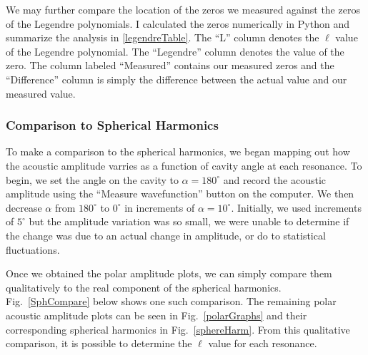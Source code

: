 \documentclass[12pt]{article}
\renewcommand{\deg}{^\circ} %
\newcommand{\figref}[1]{Fig.\ \ref{#1}}
\begin{document}
	We may further compare the location of the zeros we measured against the zeros of the Legendre polynomials. I calculated the zeros numerically in Python and summarize the analysis in \cref{legendreTable}. The ``L'' column denotes the $\ell$ value of the Legendre polynomial. The ``Legendre'' column denotes the value of the zero. The column labeled ``Measured'' contains our measured zeros and the ``Difference'' column is simply the difference between the actual value and our measured value.


	\subsubsection{Comparison to Spherical Harmonics}
	To make a comparison to the spherical harmonics, we began mapping out how the acoustic amplitude varries as a function of cavity angle at each resonance. To begin, we set the angle on the cavity to $\alpha = 180 \deg$ and record the acoustic amplitude using the ``Measure wavefunction'' button on the computer. We then decrease $\alpha$ from $180 \deg$ to $0 \deg$ in increments of $\alpha = 10\deg$. Initially, we used increments of $5\deg$ but the amplitude variation was so small, we were unable to determine if the change was due to an actual change in amplitude, or do to statistical fluctuations. 
	
	Once we obtained the polar amplitude plots, we can simply compare them qualitatively to the real component of the spherical harmonics. \figref{SphCompare} below shows one such comparison. The remaining polar acoustic amplitude plots can be seen in \figref{polarGraphs} and their corresponding spherical harmonics in \figref{sphereHarm}. From this qualitative comparison, it is possible to determine the $\ell$ value for each resonance.
	
	
	
\end{document}
